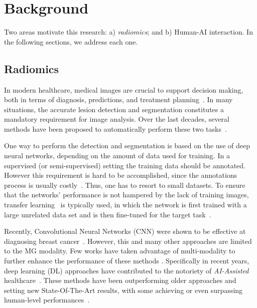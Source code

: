 \section{Background}
\label{sec:related_work}

Two areas motivate this research: a) {\it radiomics}; and b) Human-AI interaction. In the following sections, we address each one.

\subsection{Radiomics}\label{sec:Radiomics}

In modern healthcare, medical images are crucial to support decision making, both in terms of diagnosis, predictions, and treatment planning~\cite{https://doi.org/10.13140/rg.2.2.25718.65606}.
In many situations, the accurate lesion detection and segmentation constitutes a mandatory requirement for image analysis. 
Over the last decades, several methods have been proposed to automatically perform these two tasks~\cite{litjens2017survey}.

One way to perform the detection and segmentation is based on the use of deep neural networks, depending on the amount of data used for training.
In a supervised (or semi-supervised) setting the training data should be annotated.
However this requirement is hard to be accomplished, since the annotations process is usually costly~\cite{https://doi.org/10.13140/rg.2.2.14792.55049, https://doi.org/10.13140/rg.2.2.16086.88649, 10.1145/3399715.3399744}.
Thus, one has to resort to small datasets.
To ensure that the networks' performance is not hampered by the lack of training images, transfer learning~\cite{NEURIPS2019_eb1e7832} is typically used, in which the network is first trained with a large unrelated data set and is then fine-tuned for the target task~\cite{shin2016deep}.

Recently, Convolutional Neural Networks (CNN) were shown to be effective at diagnosing breast cancer~\cite{carneiro2017automated}.
However, this and many other approaches \cite{becker2017deep, khan2019novel, wang2016discrimination} are limited to the MG modality.
Few works have taken advantage of multi-modality to further enhance the performance of these methods \cite{murtaza2019deep}.
Specifically in recent years, deep learning (DL) approaches have contributed to the notoriety of {\it AI-Assisted} healthcare~\cite{topol2019high}.
These methods have been outperforming older approaches and setting  new State-Of-The-Art results, with some achieving or even surpassing human-level performances~\cite{esteva2017dermatologist,gale2017detecting}.

